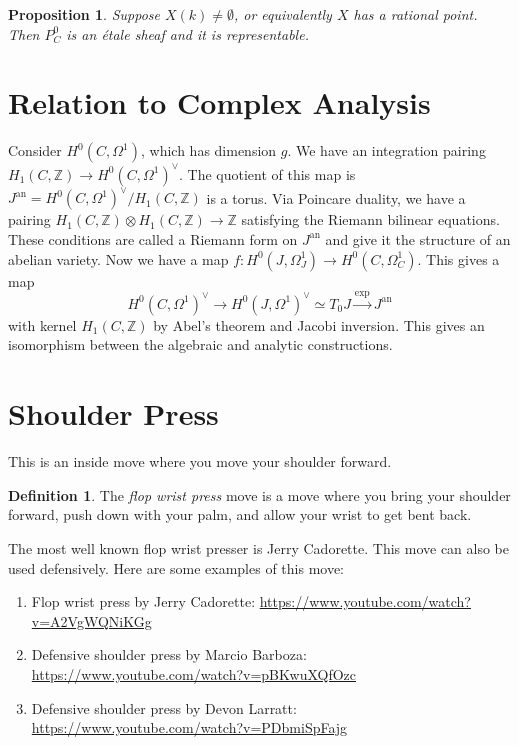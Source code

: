 \documentclass[leqno, openany]{memoir}
\newtheorem{prop}[thm]{Proposition}
\theoremstyle{definition}
\newtheorem{defn}[thm]{Definition}
\theoremstyle{remark}
\theoremstyle{plain}
\theoremstyle{definition}
\theoremstyle{remark}
\newcommand{\Z}{\mathbb{Z}}
\newcommand{\mr}[1]{\mathrm{#1}}
\begin{document}
\begin{prop} Suppose $X(k) \neq \emptyset$, or equivalently $X$ has a rational
point. Then $P_C^0$ is an \'etale sheaf and it is representable.  \end{prop}

\section{Relation to Complex Analysis}%
\label{sec:relation_to_complex_analysis}

Consider $H^0(C, \Omega^1)$, which has dimension $g$. We have an integration
pairing $H_1(C, \Z) \to {H^0(C, \Omega^1)}^{\vee}$. The quotient of this map is
$J^{\mr{an}} = {H^0(C, \Omega^1)}^{\vee} / H_1(C, \Z)$ is a torus. Via Poincare
duality, we have a pairing $H_1(C, \Z) \otimes H_1(C, \Z) \to \Z$ satisfying
the Riemann bilinear equations. These conditions are called a Riemann form on
$J^{\mr{an}}$ and give it the structure of an abelian variety. Now we have a
map $f \colon H^0(J, \Omega^1_J) \to H^0(C, \Omega^1_C)$. This gives a map \[
{H^0(C, \Omega^1)}^{\vee} \to {H^0(J, \Omega^1)}^{\vee} \simeq T_0 J
\xrightarrow{\mr{exp}} J^{\mr{an}} \] with kernel $H_1(C, \Z)$ by Abel's
theorem and Jacobi inversion. This gives an isomorphism between the algebraic
and analytic constructions.

\section{Shoulder Press}%

This is an inside move where you move your shoulder forward.

\begin{defn} The \textit{flop wrist press} move is a move where you bring your
shoulder forward, push down with your palm, and allow your wrist to get bent
back.  \end{defn}

The most well known flop wrist presser is Jerry Cadorette. This move can also
be used defensively. Here are some examples of this move:

\begin{enumerate} \item Flop wrist press by Jerry Cadorette:
    \url{https://www.youtube.com/watch?v=A2VgWQNiKGg} \item Defensive shoulder
    press by Marcio Barboza: \url{https://www.youtube.com/watch?v=pBKwuXQfOzc}
\item Defensive shoulder press by Devon Larratt:
    \url{https://www.youtube.com/watch?v=PDbmiSpFajg} \end{enumerate}
\end{document}
